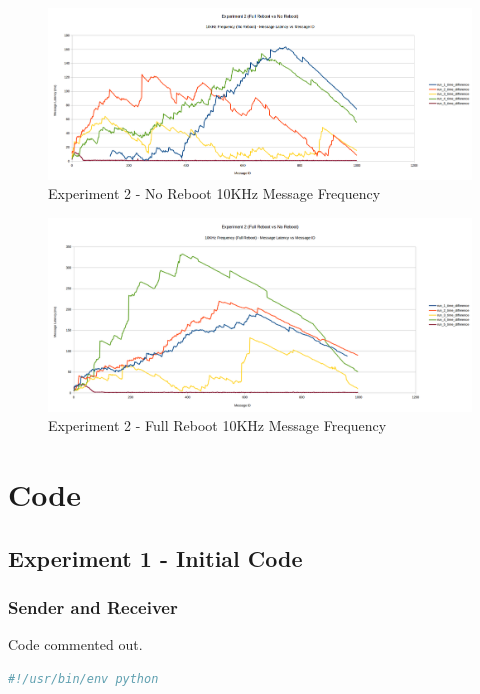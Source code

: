 \documentclass{l4proj}
\begin{document}
\begin{appendices}
\begin{figure}
\centering
\includegraphics[width=\textwidth]{images/no-reboot-10khz.png}
\caption{Experiment 2 - No Reboot 10KHz Message Frequency}
\label{exp2-noreboot-10khz}
\end{figure}

\begin{figure}
\centering
\includegraphics[width=\textwidth]{images/full-reboot-10khz.png}
\caption{Experiment 2 - Full Reboot 10KHz Message Frequency}
\label{exp2-fullreboot-10khz}
\end{figure}
\fi
\chapter{Code}

\section{Experiment 1 - Initial Code}
\label{Exp1InitCode}

\subsection{Sender and Receiver}

Code commented out.
\iffalse
\begin{lstlisting}[language=Python]
#!/usr/bin/env python


\end{lstlisting}
\end{appendices}
\end{document}
